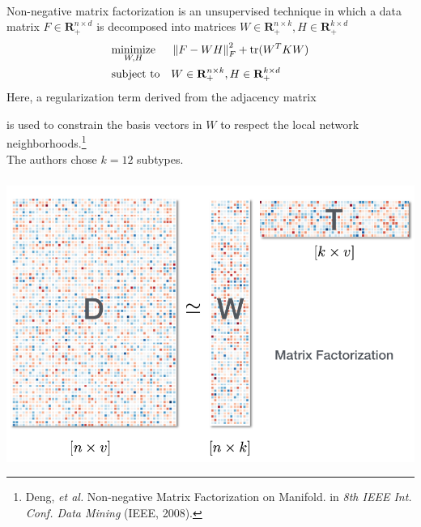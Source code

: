 \begin{frame}[fragile] \frametitle{}
       \\
    \vspace{0.5cm}
    Non-negative matrix factorization is an unsupervised technique in which
    a data matrix $F \in \mathbf{R}_+^{n\times d}$ is decomposed into matrices
    $W\in\mathbf{R}_+^{n\times k}, H\in\mathbf{R}_+^{k\times d}$
    \begin{align*}
        \minimize{
            \norm{F - WH}_F^2 + \tr(W^T K W)
        }{W, H}{
            W \in \RR_+^{n\times k},
            H \in \RR_+^{k\times d}
        }
    \end{align*}
    Here, a regularization term derived from the adjacency matrix

    is used to constrain the basis vectors in $W$ to respect the
    local network neighborhoods.\footnote{
        Deng, \textit{et al.} Non-negative Matrix Factorization on Manifold.
        in \textit{8th IEEE Int. Conf. Data Mining} (IEEE, 2008).
        \vspace{0.2cm}
    }\\
    \vspace{0.2cm}
    The authors chose $k=12$ subtypes.
\end{frame}
\begin{frame}[fragile] \frametitle{}
    \includegraphics[width=\textwidth]{img/nmf.png}
\end{frame}

